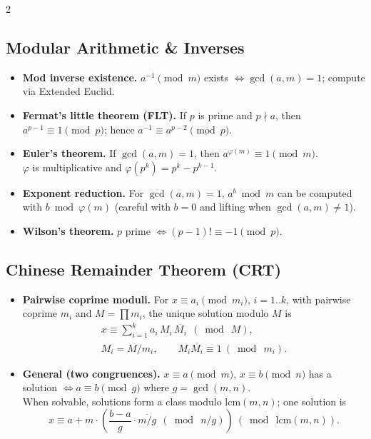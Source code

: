 \documentclass[8pt]{extarticle}
\theoremstyle{definition}
\begin{document}
\begin{multicols*}{2}
\subsection{Modular Arithmetic \& Inverses}
\begin{itemize}
  \item \textbf{Mod inverse existence.} $a^{-1}\pmod m$ exists $\iff \gcd(a,m)=1$; compute via Extended Euclid.
  \item \textbf{Fermat's little theorem (FLT).} If $p$ is prime and $p\nmid a$, then $a^{p-1}\equiv 1\pmod p$; hence $a^{-1}\equiv a^{p-2}\pmod p$.
  \item \textbf{Euler's theorem.} If $\gcd(a,m)=1$, then $a^{\varphi(m)}\equiv 1\pmod m$. \\
        $\varphi$ is multiplicative and $\varphi(p^k)=p^k-p^{k-1}$.
  \item \textbf{Exponent reduction.} For $\gcd(a,m)=1$, $a^b\bmod m$ can be computed with $b\bmod \varphi(m)$ (careful with $b=0$ and lifting when $\gcd(a,m)\ne 1$).
  \item \textbf{Wilson's theorem.} $p$ prime $\iff (p-1)!\equiv -1\pmod p$.
\end{itemize}

\subsection{Chinese Remainder Theorem (CRT)}
\begin{itemize}
  \item \textbf{Pairwise coprime moduli.} For $x\equiv a_i\pmod{m_i}$, $i=1..k$, with pairwise coprime $m_i$ and $M=\prod m_i$, the unique solution modulo $M$ is
  \[
    \begin{gathered}
    x \equiv \sum_{i=1}^k a_i\,M_i\,\overline{M_i}\ \ (\bmod\ M),\\
    M_i=M/m_i,\qquad M_i\overline{M_i}\equiv 1\ (\bmod\ m_i).
    \end{gathered}
  \]
  \item \textbf{General (two congruences).} $x\equiv a\pmod m$, $x\equiv b\pmod n$ has a solution $\iff a\equiv b\pmod{g}$ where $g=\gcd(m,n)$. \\
        When solvable, solutions form a class modulo $\mathrm{lcm}(m,n)$; one solution is
  \[
    x \equiv a + m\cdot \left( \frac{b-a}{g}\cdot \overline{m/g} \ \ (\bmod\ n/g) \right)\ (\bmod\ \mathrm{lcm}(m,n)).
  \]
\end{itemize}


\end{multicols*}
\end{document}
